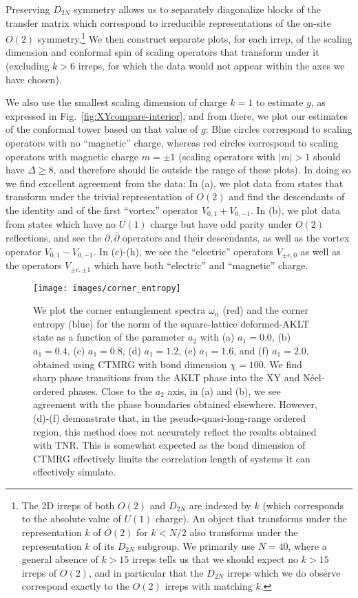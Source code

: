 \documentclass[aps,prb,letterpaper,superscriptaddress,twocolumn,showpacs,floatfix,10pt]{revtex4-1}
\begin{document}
Preserving $D_{2N}$ symmetry allows us to separately diagonalize blocks of
the transfer matrix which correspond to irreducible representations of
the on-site $O(2)$ symmetry.\footnote{The 2D irreps of
both $O(2)$ and $D_{2N}$ are indexed by $k$ (which corresponds to the absolute
value of $U(1)$ charge). An object that transforms under the representation $k$
of $O(2)$ for $k<N/2$ also transforms under the representation $k$ of its
$D_{2N}$ subgroup. We primarily use
$N=40$, where a general absence of $k>15$ irreps tells us that we should
expect no $k>15$ irreps of $O(2)$, and in particular that the $D_{2N}$ irreps
which we do observe correspond exactly to the $O(2)$ irreps with matching $k$.}
We then construct separate plots, for each irrep, of the scaling dimension and
conformal spin of scaling operators that transform under it (excluding
$k>6$ irreps, for which the data would not appear within the axes we have
chosen).

We also use the
smallest scaling dimension of charge $k=1$ to estimate $g$, as expressed in
Fig.~\ref{fig:XYcompare-interior}, and from there, we
plot our estimates of the conformal tower based on that value of $g$:
Blue circles correspond to scaling operators with no ``magnetic'' charge,
whereas red circles correspond to scaling operators with magnetic charge
$m = \pm 1$ (scaling operators with $|\!m\!|>1$ should have
$\Delta \geq 8$, and therefore should lie outside the range of these plots).
In doing so we find excellent agreement from the data:
In (a), we plot data from states that transform under the trivial
representation of $O(2)$ and find the descendants of the identity and of
the first ``vortex'' operator $V_{0,1} + V_{0,-1}$. In (b), we plot data from
states which have no $U(1)$ charge but have odd parity under $O(2)$ reflections,
and see the $\partial,\bar\partial$ operators and their descendants, as well as
the vortex operator $V_{0,1} - V_{0,-1}$. In (c)-(h), we see the
``electric'' operators $V_{\pm e,0}$ as well as the operators
$V_{\pm e,\pm 1}$ which have both ``electric'' and ``magnetic'' charge.

\makeatletter\onecolumngrid@push\makeatother

\begin{figure*}
\texttt{[image: images/corner\_entropy]}
\caption{
We plot the corner entanglement spectra $\omega_\alpha$ (red) and the
corner entropy (blue) for the norm of the square-lattice deformed-AKLT state as
a function of the parameter $a_2$  with 
(a) $a_1=0.0$,  (b) $a_1=0.4$, (c) $a_1=0.8$, (d) $a_1=1.2$, (e) $a_1=1.6$, and (f) $a_1=2.0$, obtained using CTMRG with bond dimension $\chi=100$. 
We find sharp phase transitions from the AKLT phase into the XY and
N\'eel-ordered phases. Close to the $a_2$ axis, in (a) and (b), we see
agreement with the phase boundaries obtained elsewhere. However, (d)-(f)
demonstrate that, in the pseudo-quasi-long-range ordered region, this method
does not accurately reflect the results obtained with TNR. This is somewhat
expected as the bond dimension of CTMRG effectively limits the correlation
length of systems it can effectively simulate.  }
\label{fig:corner_entropy}
\end{figure*}
\end{document}
